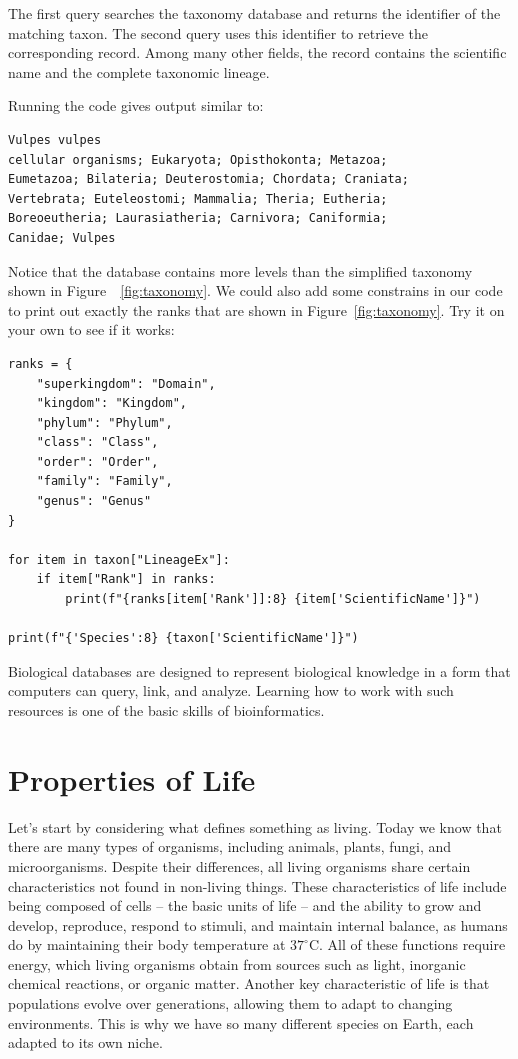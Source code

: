 The first query searches the taxonomy database and returns the
identifier of the matching taxon. The second query uses this identifier
to retrieve the corresponding record. Among many other fields, the
record contains the scientific name and the complete taxonomic lineage.

Running the code gives output similar to:

\vspace*{3mm}
\begin{lstlisting}
Vulpes vulpes
cellular organisms; Eukaryota; Opisthokonta; Metazoa;
Eumetazoa; Bilateria; Deuterostomia; Chordata; Craniata;
Vertebrata; Euteleostomi; Mammalia; Theria; Eutheria;
Boreoeutheria; Laurasiatheria; Carnivora; Caniformia;
Canidae; Vulpes
\end{lstlisting}

Notice that the database contains more levels than the simplified taxonomy shown in Figure~~\ref{fig:taxonomy}. We could also add some constrains in our code to print out exactly the ranks that are shown in Figure~\ref{fig:taxonomy}. Try it on your own to see if it works:

\vspace*{3mm}
\begin{lstlisting}
ranks = {
    "superkingdom": "Domain",
    "kingdom": "Kingdom",
    "phylum": "Phylum",
    "class": "Class",
    "order": "Order",
    "family": "Family",
    "genus": "Genus"
}

for item in taxon["LineageEx"]:
    if item["Rank"] in ranks:
        print(f"{ranks[item['Rank']]:8} {item['ScientificName']}")

print(f"{'Species':8} {taxon['ScientificName']}")
\end{lstlisting}

Biological databases are designed to represent biological knowledge in a form that computers can query, link, and analyze. Learning how to work with such resources is one of the basic skills of bioinformatics.

\section{Properties of Life}

Let's start by considering what defines something as living. Today we know that there are many types of organisms, including animals, plants, fungi, and microorganisms. Despite their differences, all living organisms share certain characteristics not found in non-living things. These characteristics of life include being composed of cells -- the basic units of life -- and the ability to grow and develop, reproduce, respond to stimuli, and maintain internal balance, as humans do by maintaining their body temperature at \(37^\circ\mathrm{C}\). All of these functions require energy, which living organisms obtain from sources such as light, inorganic chemical reactions, or organic matter. Another key characteristic of life is that populations evolve over generations, allowing them to adapt to changing environments. This is why we have so many different species on Earth, each adapted to its own niche.

